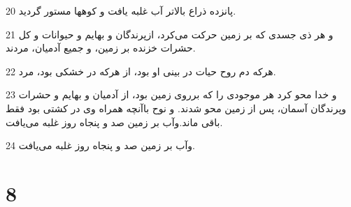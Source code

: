 \par 20 پانزده ذراع بالاتر آب غلبه یافت و کوهها مستور گردید.
\par 21 و هر ذی جسدی که بر زمین حرکت می‌کرد، ازپرندگان و بهایم و حیوانات و کل حشرات خزنده بر زمین، و جمیع آدمیان، مردند.
\par 22 هرکه دم روح حیات در بینی او بود، از هر‌که در خشکی بود، مرد.
\par 23 و خدا محو کرد هر موجودی را که برروی زمین بود، از آدمیان و بهایم و حشرات وپرندگان آسمان، پس از زمین محو شدند. و نوح باآنچه همراه وی در کشتی بود فقط باقی ماند.وآب بر زمین صد و پنجاه روز غلبه می‌یافت.
\par 24 وآب بر زمین صد و پنجاه روز غلبه می‌یافت.
 
\chapter{8}

